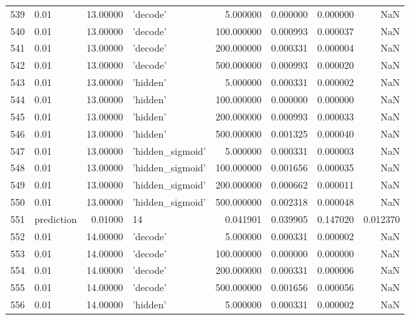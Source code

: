 \documentclass[10pt,a4paper]{article}
\begin{document}
\begin{tabular}{llrlrrrr}
539  &        0.01 &  13.00000 &           'decode' &    5.000000 &  0.000000 &  0.000000 &       NaN \\
540  &        0.01 &  13.00000 &           'decode' &  100.000000 &  0.000993 &  0.000037 &       NaN \\
541  &        0.01 &  13.00000 &           'decode' &  200.000000 &  0.000331 &  0.000004 &       NaN \\
542  &        0.01 &  13.00000 &           'decode' &  500.000000 &  0.000993 &  0.000020 &       NaN \\
543  &        0.01 &  13.00000 &           'hidden' &    5.000000 &  0.000331 &  0.000002 &       NaN \\
544  &        0.01 &  13.00000 &           'hidden' &  100.000000 &  0.000000 &  0.000000 &       NaN \\
545  &        0.01 &  13.00000 &           'hidden' &  200.000000 &  0.000993 &  0.000033 &       NaN \\
546  &        0.01 &  13.00000 &           'hidden' &  500.000000 &  0.001325 &  0.000040 &       NaN \\
547  &        0.01 &  13.00000 &   'hidden\_sigmoid' &    5.000000 &  0.000331 &  0.000003 &       NaN \\
548  &        0.01 &  13.00000 &   'hidden\_sigmoid' &  100.000000 &  0.001656 &  0.000035 &       NaN \\
549  &        0.01 &  13.00000 &   'hidden\_sigmoid' &  200.000000 &  0.000662 &  0.000011 &       NaN \\
550  &        0.01 &  13.00000 &   'hidden\_sigmoid' &  500.000000 &  0.002318 &  0.000048 &       NaN \\
551  &  prediction &   0.01000 &                 14 &    0.041901 &  0.039905 &  0.147020 &  0.012370 \\
552  &        0.01 &  14.00000 &           'decode' &    5.000000 &  0.000331 &  0.000002 &       NaN \\
553  &        0.01 &  14.00000 &           'decode' &  100.000000 &  0.000000 &  0.000000 &       NaN \\
554  &        0.01 &  14.00000 &           'decode' &  200.000000 &  0.000331 &  0.000006 &       NaN \\
555  &        0.01 &  14.00000 &           'decode' &  500.000000 &  0.001656 &  0.000056 &       NaN \\
556  &        0.01 &  14.00000 &           'hidden' &    5.000000 &  0.000331 &  0.000002 &       NaN \\

\end{tabular}
\end{document}
